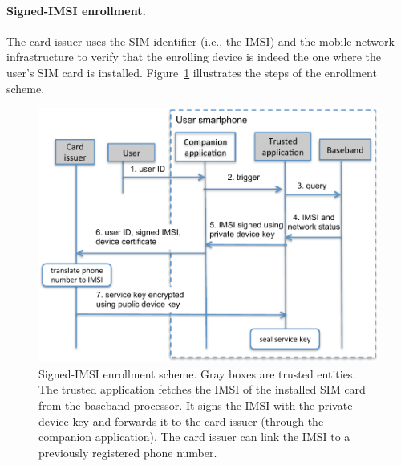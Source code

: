 \paragraph{Signed-IMSI enrollment.}

The card issuer uses the SIM identifier (i.e., the IMSI) and the mobile network
infrastructure to verify that the enrolling device is indeed the one where the
user's SIM card is installed. Figure~\ref{fig:ps_tee_enrollment-trustzone} illustrates the steps of the enrollment scheme.

\begin{figure}[!ht]
    \centering
    \includegraphics[width=\linewidth]{figures/phonesecures/tee_enrollment-trustzone}
    \caption[Signed-IMSI enrollment scheme]{Signed-IMSI enrollment scheme.
    Gray boxes are trusted entities. The trusted application fetches the IMSI
    of the installed SIM card from the baseband processor. It signs the IMSI
    with the private device key and forwards it to the card issuer (through the
    companion application). The card issuer can link the IMSI to a previously
    registered phone number.}
    \label{fig:ps_tee_enrollment-trustzone}
\end{figure}

